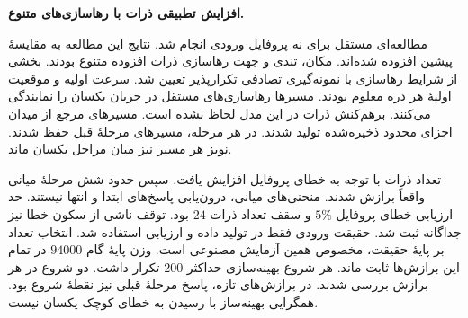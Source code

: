 \begin{FlowRevisionText}
\par\medskip
\noindent\textbf{افزایش تطبیقی ذرات با رهاسازی‌های متنوع.}\par\smallskip
مطالعه‌ای مستقل برای نه پروفایل ورودی انجام شد.
نتایج این مطالعه به مقایسهٔ پیشین افزوده شده‌اند.
مکان، تندی و جهت رهاسازی ذرات افزوده متنوع بودند.
بخشی از شرایط رهاسازی با نمونه‌گیری تصادفی تکرارپذیر تعیین شد.
سرعت اولیه و موقعیت اولیهٔ هر ذره معلوم بودند.
مسیرها رهاسازی‌های مستقل در جریان یکسان را نمایندگی می‌کنند.
برهم‌کنش ذرات در این مدل لحاظ نشده است.
مسیرهای مرجع از میدان اجزای محدود ذخیره‌شده تولید شدند.
در هر مرحله، مسیرهای مرحلهٔ قبل حفظ شدند.
نویز هر مسیر نیز میان مراحل یکسان ماند.

تعداد ذرات با توجه به خطای پروفایل افزایش یافت.
سپس حدود شش مرحلهٔ میانی واقعاً برازش شدند.
منحنی‌های میانی، درون‌یابی پاسخ‌های ابتدا و انتها نیستند.
حد ارزیابی خطای پروفایل $5\%$ و سقف تعداد ذرات $24$ بود.
توقف ناشی از سکون خطا نیز جداگانه ثبت شد.
حقیقت ورودی فقط در تولید داده و ارزیابی استفاده شد.
انتخاب تعداد بر پایهٔ حقیقت، مخصوص همین آزمایش مصنوعی است.
وزن پایهٔ گام $94000$ در تمام این برازش‌ها ثابت ماند.
هر شروع بهینه‌سازی حداکثر $200$ تکرار داشت.
دو شروع در هر برازش بررسی شدند.
در برازش‌های تازه، پاسخ مرحلهٔ قبلی نیز نقطهٔ شروع بود.
همگرایی بهینه‌ساز با رسیدن به خطای کوچک یکسان نیست.


\end{FlowRevisionText}
